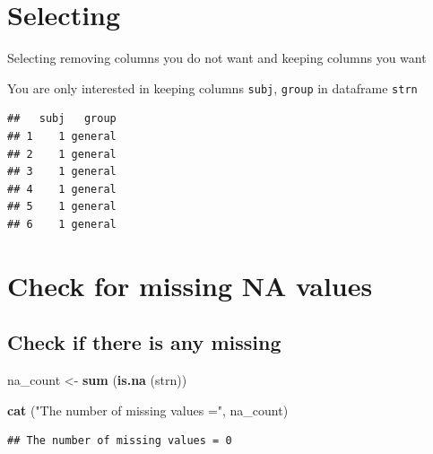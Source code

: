 \documentclass[
]{book}
\newenvironment{Shaded}{\begin{snugshade}}{\end{snugshade}}
\newcommand{\KeywordTok}[1]{\textcolor[rgb]{0.13,0.29,0.53}{\textbf{#1}}}
\newcommand{\NormalTok}[1]{#1}
\newcommand{\OperatorTok}[1]{\textcolor[rgb]{0.81,0.36,0.00}{\textbf{#1}}}
\newcommand{\StringTok}[1]{\textcolor[rgb]{0.31,0.60,0.02}{#1}}
\begin{document}
\hypertarget{selecting}{%
\section{Selecting}\label{selecting}}

Selecting removing columns you do not want and keeping columns you want

You are only interested in keeping columns \texttt{subj}, \texttt{group} in dataframe \texttt{strn}

\begin{Shaded}
\end{Shaded}

\begin{verbatim}
##   subj   group
## 1    1 general
## 2    1 general
## 3    1 general
## 4    1 general
## 5    1 general
## 6    1 general
\end{verbatim}

\hypertarget{check-for-missing-na-values}{%
\section{Check for missing NA values}\label{check-for-missing-na-values}}

\hypertarget{check-if-there-is-any-missing}{%
\subsection{Check if there is any missing}\label{check-if-there-is-any-missing}}

\begin{Shaded}
\begin{Highlighting}[]
\NormalTok{na_count <-}\StringTok{  }\KeywordTok{sum}\NormalTok{ (}\KeywordTok{is.na}\NormalTok{ (strn))}

\KeywordTok{cat}\NormalTok{ (}\StringTok{"The number of missing values ="}\NormalTok{, na_count)}
\end{Highlighting}
\end{Shaded}

\begin{verbatim}
## The number of missing values = 0
\end{verbatim}
\end{document}
